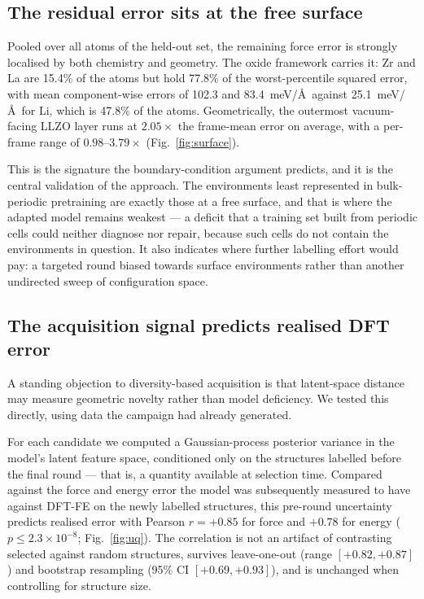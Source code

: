 \documentclass[11pt]{article}
\begin{document}
\subsection{The residual error sits at the free surface}

Pooled over all atoms of the held-out set, the remaining force error is
strongly localised by both chemistry and geometry. The oxide framework carries
it: Zr and La are 15.4\% of the atoms but hold 77.8\% of the worst-percentile
squared error, with mean component-wise errors of 102.3 and 83.4~meV/\AA\
against 25.1~meV/\AA\ for Li, which is 47.8\% of the atoms. Geometrically, the
outermost vacuum-facing LLZO layer runs at $2.05\times$ the frame-mean error on
average, with a per-frame range of $0.98$--$3.79\times$ (Fig.~\ref{fig:surface}).

This is the signature the boundary-condition argument predicts, and it is the
central validation of the approach. The environments least represented in
bulk-periodic pretraining are exactly those at a free surface, and that is
where the adapted model remains weakest --- a deficit that a training set built
from periodic cells could neither diagnose nor repair, because such cells do
not contain the environments in question. It also indicates where further
labelling effort would pay: a targeted round biased towards surface
environments rather than another undirected sweep of configuration space.

\subsection{The acquisition signal predicts realised DFT error}
\label{sec:uq}

A standing objection to diversity-based acquisition is that latent-space
distance may measure geometric novelty rather than model deficiency. We tested
this directly, using data the campaign had already generated.

For each candidate we computed a Gaussian-process posterior variance in the
model's latent feature space, conditioned only on the structures labelled
before the final round --- that is, a quantity available at selection time.
Compared against the force and energy error the model was subsequently measured
to have against DFT-FE on the newly labelled structures, this pre-round
uncertainty predicts realised error with Pearson $r=+0.85$ for force and
$+0.78$ for energy ($p\leq2.3\times10^{-8}$; Fig.~\ref{fig:uq}). The correlation is not an
artifact of contrasting selected against random structures, survives
leave-one-out (range $[+0.82,+0.87]$) and bootstrap resampling (95\% CI
$[+0.69,+0.93]$), and is unchanged when controlling for structure size.
\end{document}
